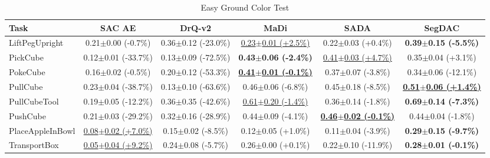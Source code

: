 \begin{table}[htbp]
\centering
\scriptsize
\caption{Easy Ground Color Test}
\label{tab:appendix_groundcolortest_easy}
\begin{adjustbox}{max width=\textwidth}
\begin{tabular}{l*{5}{c}}
\toprule
\textbf{Task} & \textbf{SAC AE} & \textbf{DrQ-v2} & \textbf{MaDi} & \textbf{SADA} & \textbf{SegDAC} \\
\midrule
LiftPegUpright & 0.21$\pm$0.00 \scriptsize{(-0.7\%)} & 0.36$\pm$0.12 \scriptsize{(-23.0\%)} & \underline{0.23$\pm$0.01 \scriptsize{(+2.5\%)}} & 0.22$\pm$0.03 \scriptsize{(+0.4\%)} & \textbf{0.39$\pm$0.15 \scriptsize{(-5.5\%)}} \\
PickCube & 0.12$\pm$0.01 \scriptsize{(-33.7\%)} & 0.13$\pm$0.09 \scriptsize{(-72.5\%)} & \textbf{0.43$\pm$0.06 \scriptsize{(-2.4\%)}} & \underline{0.41$\pm$0.03 \scriptsize{(+4.7\%)}} & 0.35$\pm$0.04 \scriptsize{(+3.1\%)} \\
PokeCube & 0.16$\pm$0.02 \scriptsize{(-0.5\%)} & 0.20$\pm$0.12 \scriptsize{(-53.3\%)} & \textbf{\underline{0.41$\pm$0.01 \scriptsize{(-0.1\%)}}} & 0.37$\pm$0.07 \scriptsize{(-3.8\%)} & 0.34$\pm$0.06 \scriptsize{(-12.1\%)} \\
PullCube & 0.23$\pm$0.04 \scriptsize{(-38.7\%)} & 0.13$\pm$0.10 \scriptsize{(-63.6\%)} & 0.46$\pm$0.06 \scriptsize{(-6.8\%)} & 0.45$\pm$0.18 \scriptsize{(-8.5\%)} & \textbf{\underline{0.51$\pm$0.06 \scriptsize{(+1.4\%)}}} \\
PullCubeTool & 0.19$\pm$0.05 \scriptsize{(-12.2\%)} & 0.36$\pm$0.35 \scriptsize{(-42.6\%)} & \underline{0.61$\pm$0.20 \scriptsize{(-1.4\%)}} & 0.36$\pm$0.14 \scriptsize{(-1.8\%)} & \textbf{0.69$\pm$0.14 \scriptsize{(-7.3\%)}} \\
PushCube & 0.21$\pm$0.03 \scriptsize{(-29.2\%)} & 0.32$\pm$0.16 \scriptsize{(-28.9\%)} & 0.44$\pm$0.09 \scriptsize{(-4.1\%)} & \textbf{\underline{0.46$\pm$0.02 \scriptsize{(-0.1\%)}}} & 0.44$\pm$0.04 \scriptsize{(-1.8\%)} \\
PlaceAppleInBowl & \underline{0.08$\pm$0.02 \scriptsize{(+7.0\%)}} & 0.15$\pm$0.02 \scriptsize{(-8.5\%)} & 0.12$\pm$0.05 \scriptsize{(+1.0\%)} & 0.11$\pm$0.04 \scriptsize{(-3.9\%)} & \textbf{0.29$\pm$0.15 \scriptsize{(-9.7\%)}} \\
TransportBox & \underline{0.05$\pm$0.04 \scriptsize{(+9.2\%)}} & 0.24$\pm$0.08 \scriptsize{(-5.7\%)} & 0.26$\pm$0.00 \scriptsize{(+0.1\%)} & 0.22$\pm$0.10 \scriptsize{(-11.9\%)} & \textbf{0.28$\pm$0.01 \scriptsize{(-0.1\%)}} \\
\bottomrule
\end{tabular}
\end{adjustbox}
\end{table}

